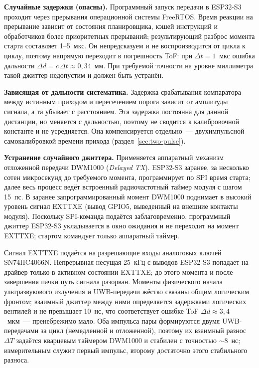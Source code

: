 \textbf{Случайные задержки (опасны).}
Программный запуск передачи в ESP32-S3 проходит через прерывания операционной системы
FreeRTOS. Время реакции на прерывание зависит от состояния планировщика, кэшей
инструкций и обработчиков более приоритетных прерываний; результирующий разброс
момента старта составляет 1--5~мкс. Он непредсказуем и не воспроизводится
от цикла к циклу, поэтому напрямую переходит в погрешность ToF: при $\Delta t = 1$~мкс
ошибка дальности $\Delta d = c\,\Delta t \approx 0{,}34$~мм. При требуемой точности
на уровне миллиметра такой джиттер недопустим и должен быть устранён.

\textbf{Зависящая от дальности систематика.}
Задержка срабатывания компаратора между истинным приходом и пересечением порога зависит от
амплитуды сигнала, а та убывает с расстоянием. Эта задержка постоянна для данной дистанции,
но меняется с дальностью, поэтому не сводится к калибровочной константе и не усредняется.
Она компенсируется отдельно~--- двухимпульсной самокалибровкой времени прихода
(раздел~\ref{sec:two-pulse}).

\textbf{Устранение случайного джиттера.}
Применяется аппаратный механизм отложенной передачи DWM1000 (\textit{Delayed TX}).
ESP32-S3 заранее, за несколько сотен микросекунд до требуемого момента, программирует
по SPI время старта; далее весь процесс ведёт встроенный радиочастотный таймер модуля
с шагом 15~пс. В заранее запрограммированный момент DWM1000 поднимает в высокий уровень
сигнал EXTTXE (вывод GPIO5, выведенный на внешние контакты модуля). Поскольку SPI-команда
подаётся заблаговременно, программный джиттер ESP32-S3 укладывается в окно ожидания и
не переходит на момент EXTTXE; стартом командует только аппаратный таймер.

Сигнал EXTTXE подаётся на разрешающие входы аналоговых ключей SN74HC4066N.
Непрерывная несущая 25~кГц с выводов ESP32-S3 попадает на драйвер только в активном
состоянии EXTTXE; до этого момента и после завершения пачки путь сигнала разорван.
Моменты физического начала ультразвукового излучения и UWB-передачи жёстко связаны
общим логическим фронтом; взаимный джиттер между ними определяется задержками
логических вентилей и не превышает 10~нс, что соответствует ошибке ToF
$\Delta d \approx 3{,}4$~мкм~--- пренебрежимо мало. Оба импульса пары формируются
двумя UWB-передачами за цикл (немедленной и отложенной), поэтому их взаимный разнос
$\Delta T$ задаётся кварцевым таймером DWM1000 и стабилен с точностью ${\sim}8$~нс;
измерительным служит первый импульс, второму достаточно этого стабильного разноса.


